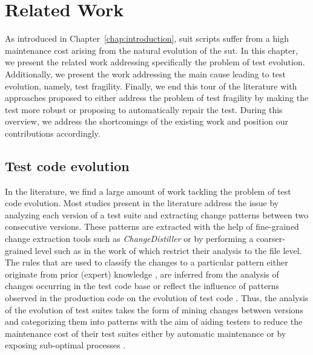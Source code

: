 \chapter{Related Work}
\label{chap:related-work}


As introduced in Chapter~\ref{chap:introduction}, \gls{suit} scripts suffer from a high maintenance cost arising from the natural evolution of the \gls{sut}. In this chapter, we present the related work addressing specifically the problem of test evolution. Additionally, we present the work addressing the main cause leading to test evolution, namely, test fragility. Finally, we end this tour of the literature with approaches proposed to either address the problem of test fragility by making the test more robust or proposing to automatically repair the test. During this overview, we address the shortcomings of the existing work and position our contributions accordingly.

\section{Test code evolution}
\label{sec:related-evolution}

In the literature, we find a large amount of work tackling the problem of test code evolution. Most studies present in the literature address the issue by analyzing each version of a test suite and extracting change patterns between two consecutive versions. These patterns are extracted with the help of fine-grained change extraction tools such as \emph{ChangeDistiller} \cite{Fluri2007} or by performing  a coarser-grained level such as in the work of \textcite{Zaidman2011} which restrict their analysis to the file level. The rules that are used to classify the changes to a particular pattern either originate from prior (expert) knowledge \cite{Marsavina2014}, are inferred from the analysis of changes occurring in the test code base \cite{Negara2014, Labuschagne2017} or reflect the influence of patterns observed in the production code on the evolution of test code \cite{VanRompaey2008}. Thus, the analysis of the evolution of test suites takes the form of mining changes between versions and categorizing them into patterns with the aim of aiding testers to reduce the maintenance cost of their test suites either by automatic maintenance \cite{Hurdugaci2012} or by exposing sub-optimal processes \cite{Labuschagne2017}.

